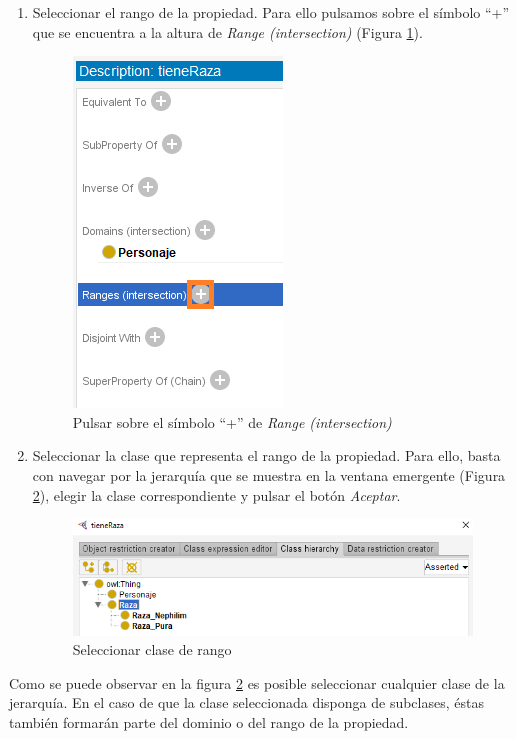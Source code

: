 \begin{enumerate}
    \item Seleccionar el rango de la propiedad. Para ello pulsamos sobre el símbolo “+” que se encuentra a la altura de 
    \textit{Range (intersection)} (Figura \ref*{CreateObjProp_5}).
    \begin{figure}[ht]
        \centering
        \includegraphics[scale=0.6]{Figures/Protege/CreateObjProp_5.png}
        \caption{Pulsar sobre el símbolo “+” de \textit{Range (intersection)}}
        \label{CreateObjProp_5}
    \end{figure}

    \item Seleccionar la clase que representa el rango de la propiedad. Para ello, basta con navegar por la 
    jerarquía que se muestra en la ventana emergente (Figura \ref*{CreateObjProp_6}), elegir la clase correspondiente 
    y pulsar el botón \textit{Aceptar}.

    \begin{figure}[H]
        \centering
        \includegraphics[scale=0.6]{Figures/Protege/CreateObjProp_6.png}
        \caption{Seleccionar clase de rango}
        \label{CreateObjProp_6}
    \end{figure}
\end{enumerate}
Como se puede observar en la figura \ref*{CreateObjProp_6} es posible seleccionar cualquier clase de la jerarquía. En el 
caso de que la clase seleccionada disponga de subclases, éstas también formarán parte del dominio o del rango de la propiedad.\medskip

